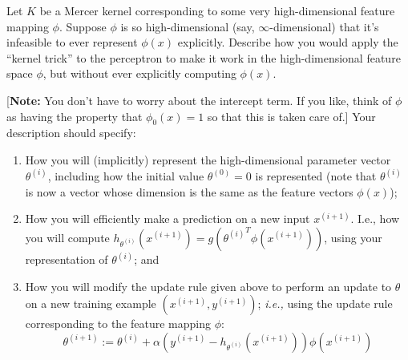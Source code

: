 \item {} Let $K$ be a Mercer kernel corresponding to some
very high-dimensional feature
mapping $\phi$. Suppose $\phi$ is so high-dimensional (say,
$\infty$-dimensional) that it's infeasible to ever represent $\phi(x)$
explicitly.  Describe how you would apply the ``kernel trick'' to the
perceptron to make it work in the high-dimensional feature space $\phi$, but
without ever explicitly computing $\phi(x)$.

[\textbf{Note:} You don't have to worry about the intercept term.  If you like,
think of $\phi$ as having the property that $\phi_0(x) = 1$ so that this is
taken care of.] Your description should specify:
\begin{enumerate}[label=\roman*.]
  \item {} How you will (implicitly) represent the
  high-dimensional
    parameter vector $\theta^{(i)}$, including how the initial value
    $\theta^{(0)} = 0$ is represented (note that $\theta^{(i)}$ is
    now a vector whose dimension is the same as the feature vectors
    $\phi(x)$);
  \item {} How you will efficiently make a prediction on a
  new input
    $x^{(i+1)}$.  I.e., how you will compute
    $h_{\theta^{(i)}}(x^{(i+1)}) = g({\theta^{(i)}}^T \phi(x^{(i+1)}))$,
    using your representation of $\theta^{(i)}$; and
  \item {} How you will modify the update rule given above
  to perform an
  update to $\theta$ on a new training example $(x^{(i+1)}, y^{(i+1)})$;
  \emph{i.e.,} using the update rule corresponding to the feature mapping
  $\phi$:
  \begin{equation*}
  \theta^{(i+1)} :=
	  \theta^{(i)} + \alpha (y^{(i+1)} - h_{\theta^{(i)}}(x^{(i+1)})) \phi(x^{(i+1)})
  \end{equation*}
\end{enumerate}
